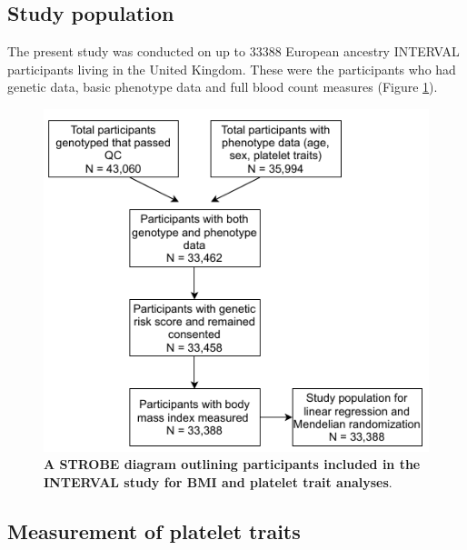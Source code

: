 \documentclass[11pt,twoside]{bristolthesis}
\begin{document}
\hypertarget{study-population}{%
\subsection{Study population}\label{study-population}}

The present study was conducted on up to 33388 European ancestry INTERVAL participants living in the United Kingdom. These were the participants who had genetic data, basic phenotype data and full blood count measures (Figure \ref{fig:INTERVAL-STROBE}).




\begin{figure}

{\centering \includegraphics[width=0.6\linewidth]{figure/BMI_platelets/STROBE_diagram} 

}

\caption[A STROBE diagram outlining participants included in the INTERVAL study for BMI and platelet trait analyses.]{\textbf{A STROBE diagram outlining participants included in the INTERVAL study for BMI and platelet trait analyses}.}\label{fig:INTERVAL-STROBE}
\end{figure}
\hypertarget{measurement-of-platelet-traits}{%
\subsection{Measurement of platelet traits}\label{measurement-of-platelet-traits}}
\end{document}
